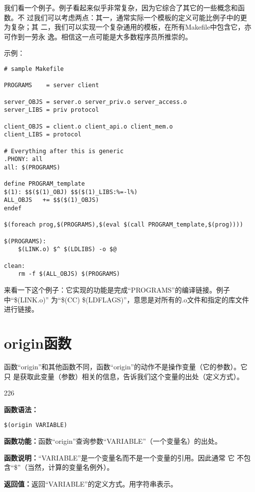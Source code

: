 我们看一个例子。例子看起来似乎非常复杂，因为它综合了其它的一些概念和函数。不
过我们可以考虑两点：其一，通常实际一个模板的定义可能比例子中的更为复杂；其
二，我们可以实现一个复杂通用的模板，在所有Makefile中包含它，亦可作到一劳永
逸。相信这一点可能是大多数程序员所推崇的。

示例：

\begin{Verbatim}[]
# sample Makefile

PROGRAMS    = server client

server_OBJS = server.o server_priv.o server_access.o
server_LIBS = priv protocol

client_OBJS = client.o client_api.o client_mem.o
client_LIBS = protocol

# Everything after this is generic
.PHONY: all
all: $(PROGRAMS)

define PROGRAM_template
$(1): $$($(1)_OBJ) $$($(1)_LIBS:%=-l%)
ALL_OBJS   += $$($(1)_OBJS)
endef

$(foreach prog,$(PROGRAMS),$(eval $(call PROGRAM_template,$(prog))))

$(PROGRAMS):
    $(LINK.o) $^ $(LDLIBS) -o $@

clean:
    rm -f $(ALL_OBJS) $(PROGRAMS)
\end{Verbatim}

来看一下这个例子：它实现的功能是完成“PROGRAMS”的编译链接。例子中“\$(LINK.o)”
为“\$(CC) \$(LDFLAGS)”，意思是对所有的.o文件和指定的库文件进行链接。

\section{origin函数}

函数“origin”和其他函数不同，函数“origin”的动作不是操作变量（它的参数）。它只
是获取此变量（参数）相关的信息，告诉我们这个变量的出处（定义方式）。
\begin{dinglist}{226}
\itemsep=4pt \parskip=0pt

\item \textbf{函数语法：}

\begin{Verbatim}[]
$(origin VARIABLE)
\end{Verbatim}

\item \textbf{函数功能：}函数“origin”查询参数“VARIABLE”（一个变量名）的出处。

\item \textbf{函数说明：}“VARIABLE”是一个变量名而不是一个变量的引用。因此通常
    它
    不包含“\$”（当然，计算的变量名例外）。

\item \textbf{返回值：}返回“VARIABLE”的定义方式。用字符串表示。

\end{dinglist}

